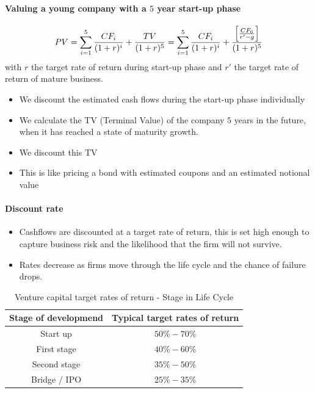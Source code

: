 \paragraph{Valuing a young company with a $5$ year start-up phase}
\begin{align*}
    PV = \sum_{i=1}^5 \frac{CF_i}{(1+r)^i} + \frac{TV}{(1+r)^5}
    = \sum_{i=1}^5 \frac{CF_i}{(1+r)^i} + \frac{\left[ \frac{CF_6}{r' - g} \right]}{(1+r)^5}
\end{align*}
with $r$ the target rate of return during start-up phase and $r'$ the target
rate of return of mature business.
\begin{itemize}
    \item We discount the estimated cash flows during the start-up phase individually
    \item We calculate the TV (Terminal Value) of the company $5$ years in the future,
        when it has reached a state of maturity growth.
    \item We discount this TV
    \item This is like pricing a bond with estimated coupons and an estimated
        notional value
\end{itemize}

\paragraph{Discount rate}


\begin{itemize}
    \item Cashflows are discounted at a target rate of return, this is set high
        enough to capture business risk and the likelihood that the firm will
        not survive.
    \item Rates decrease as firms move through the life cycle and the chance of
        failure drops.
\end{itemize}

\begin{table}[H]
    \centering
    \begin{tabular}{|c|c|}
        \hline
        Stage of developmend & Typical target rates of return \\ \hline
        Start up & $50\% - 70\%$ \\ \hline
        First stage & $40\% - 60\%$ \\ \hline
        Second stage & $35\% - 50\%$ \\ \hline
        Bridge / IPO & $25\% - 35\%$ \\ \hline
    \end{tabular}
    \caption{Venture capital target rates of return - Stage in Life Cycle}
\end{table}

